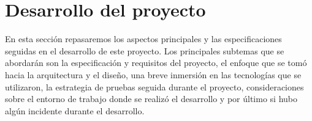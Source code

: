 \section{Desarrollo del proyecto}
En esta sección repasaremos los aspectos principales y las especificaciones seguidas 
en el desarrollo de este proyecto. Los principales subtemas que se abordarán son la 
especificación y requisitos del proyecto, el enfoque que se tomó hacia la arquitectura 
y el diseño, una breve inmersión en las tecnologías que se utilizaron, la estrategia de 
pruebas seguida durante el proyecto, consideraciones sobre el entorno de trabajo donde 
se realizó el desarrollo y por último si hubo algún incidente durante el desarrollo.







\pagebreak